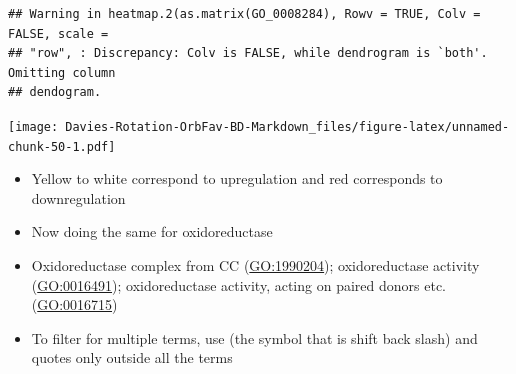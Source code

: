 \documentclass[
]{article}
\newenvironment{Shaded}{\begin{snugshade}}{\end{snugshade}}
\newcommand{\DataTypeTok}[1]{\textcolor[rgb]{0.13,0.29,0.53}{#1}}
\newcommand{\KeywordTok}[1]{\textcolor[rgb]{0.13,0.29,0.53}{\textbf{#1}}}
\newcommand{\NormalTok}[1]{#1}
\newcommand{\OperatorTok}[1]{\textcolor[rgb]{0.81,0.36,0.00}{\textbf{#1}}}
\newcommand{\OtherTok}[1]{\textcolor[rgb]{0.56,0.35,0.01}{#1}}
\newcommand{\StringTok}[1]{\textcolor[rgb]{0.31,0.60,0.02}{#1}}
\begin{document}
\begin{verbatim}
## Warning in heatmap.2(as.matrix(GO_0008284), Rowv = TRUE, Colv = FALSE, scale =
## "row", : Discrepancy: Colv is FALSE, while dendrogram is `both'. Omitting column
## dendogram.
\end{verbatim}

\texttt{[image: Davies-Rotation-OrbFav-BD-Markdown\_files/figure-latex/unnamed-chunk-50-1.pdf]}

\begin{itemize}
\item
  Yellow to white correspond to upregulation and red corresponds to
  downregulation
\item
  Now doing the same for oxidoreductase
\item
  Oxidoreductase complex from CC (\url{GO:1990204}); oxidoreductase
  activity (\url{GO:0016491}); oxidoreductase activity, acting on paired
  donors etc. (\url{GO:0016715})
\item
  To filter for multiple terms, use \textbar{} (the symbol that is shift
  back slash) and quotes only outside all the terms
\end{itemize}

\begin{Shaded}
\end{Shaded}
\end{document}
